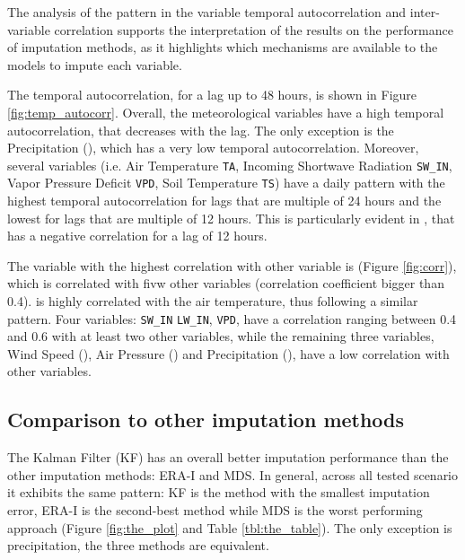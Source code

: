 \documentclass{article}
\let\Oldsubsection\subsection
\renewcommand{\subsection}{\FloatBarrier\Oldsubsection}
\begin{document}
The analysis of the pattern in the variable temporal autocorrelation and inter-variable correlation supports the interpretation of the results on the performance of imputation methods, as it highlights which mechanisms are available to the models to impute each variable.

The temporal autocorrelation, for a lag up to 48 hours, is shown in Figure \ref{fig:temp_autocorr}. Overall, the meteorological variables have a high temporal autocorrelation, that decreases with the lag. The only exception is the Precipitation (), which has a very low temporal autocorrelation. Moreover, several variables (i.e. Air Temperature \texttt{TA}, Incoming Shortwave Radiation \texttt{SW\_IN},  Vapor Pressure Deficit \texttt{VPD}, Soil Temperature \texttt{TS}) have a daily pattern with the highest temporal autocorrelation for lags that are multiple of 24 hours and the lowest for lags that are multiple of 12 hours. This is particularly evident in , that has a negative correlation for a lag of 12 hours.

The variable with the highest correlation with other variable is  (Figure \ref{fig:corr}), which is correlated with fivw other variables (correlation coefficient bigger than 0.4).  is highly correlated with the air temperature, thus following a similar pattern. Four variables: \texttt{SW\_IN} \texttt{LW\_IN}, \texttt{VPD},  have a correlation ranging between 0.4 and 0.6 with at least two other variables, while the remaining three variables, Wind Speed (), Air Pressure () and Precipitation (), have a low correlation with other variables.


\subsection{Comparison to other imputation methods}

The Kalman Filter (KF) has an overall better imputation performance than the other imputation methods: ERA-I and MDS. In general, across all tested scenario it exhibits the same pattern: KF is the method with the smallest imputation error, ERA-I is the second-best method while MDS is the worst performing approach (Figure \ref{fig:the_plot} and Table \ref{tbl:the_table}). The only exception is precipitation, the three methods are equivalent.
\end{document}
